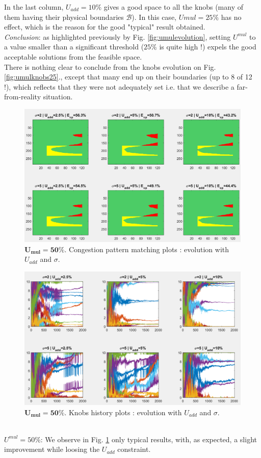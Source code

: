 In the last column, $U_{add}=10\% $ gives a good space to all the knobs (many of them having their physical boundaries $\mathscr{B}$). In this case, $U{mul}=25\% $ has no effect, which is the reason for the good "typical" result obtained.\\
\emph{Conclusion}: as highlighted previously by Fig. \ref{fig:umulevolution}, setting $U^{mul}$ to a value smaller than a significant threshold ($25\% $ is quite high !) expels the good acceptable solutions from the feasible space.\\

There is nothing clear to conclude from the knobs evolution on Fig. \ref{fig:umulknobs25}., except that many end up on their boundaries (up to 8 of 12 !), which reflects that they were not adequately set i.e. that we describe a far-from-reality situation.
\\
\begin{figure}
	\label{fig:umulcp50}
	\caption{$\mathbf{U_{mul}=50\%}$. Congestion pattern matching plots : evolution with $U_{add}$ and $\sigma$.}
	\includegraphics[width=7in]{figures/results_figures/Umul/cp_Umul_50_lambda_11.png}
\end{figure}
\begin{figure}
	\label{fig:umulknobs50}
	\caption{$\mathbf{U_{mul}=50\%}$. Knobs history plots : evolution with $U_{add}$ and $\sigma$.}
	\includegraphics[width=7in]{figures/results_figures/Umul/knobs_Umul_50_lambda_11.png}
\end{figure}	
\\
\emph{$U^{mul}=50\% $}: We observe in Fig. \ref{fig:umulcp50} only typical results, with, as expected, a slight improvement while loosing the $U_{add}$ constraint.

